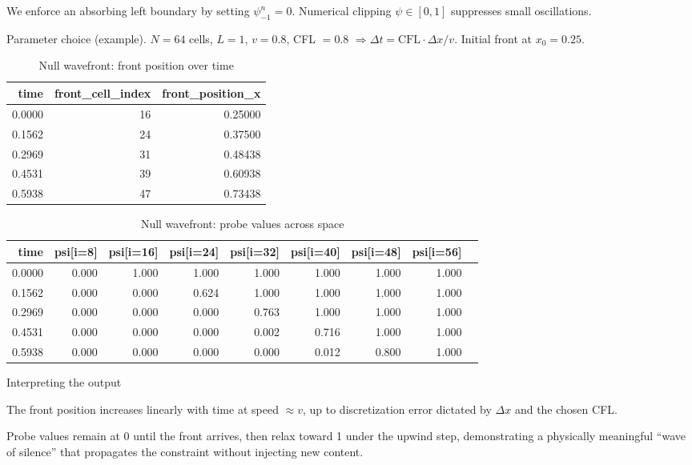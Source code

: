 \documentclass[11pt,a4paper]{article}
\begin{document}
We enforce an absorbing left boundary by setting $\psi_{-1}^n = 0$. Numerical clipping $\psi \in [0,1]$ suppresses small oscillations.

Parameter choice (example). $N=64$ cells, $L=1$, $v=0.8$, CFL $=0.8$ $\Rightarrow \Delta t = \mathrm{CFL} \cdot \Delta x / v$. Initial front at $x_0 = 0.25$.

\begin{table}[h]
\centering
\begin{tabular}{rrr}
\toprule
time & front_cell_index & front_position_x \\
\midrule
0.0000 & 16 & 0.25000 \\
0.1562 & 24 & 0.37500 \\
0.2969 & 31 & 0.48438 \\
0.4531 & 39 & 0.60938 \\
0.5938 & 47 & 0.73438 \\
\bottomrule
\end{tabular}
\caption{Null wavefront: front position over time}
\end{table}

\begin{table}[h]
\centering
\begin{tabular}{rrrrrrrrr}
\toprule
time & psi[i=8] & psi[i=16] & psi[i=24] & psi[i=32] & psi[i=40] & psi[i=48] & psi[i=56] \\
\midrule
0.0000 & 0.000 & 1.000 & 1.000 & 1.000 & 1.000 & 1.000 & 1.000 \\
0.1562 & 0.000 & 0.000 & 0.624 & 1.000 & 1.000 & 1.000 & 1.000 \\
0.2969 & 0.000 & 0.000 & 0.000 & 0.763 & 1.000 & 1.000 & 1.000 \\
0.4531 & 0.000 & 0.000 & 0.000 & 0.002 & 0.716 & 1.000 & 1.000 \\
0.5938 & 0.000 & 0.000 & 0.000 & 0.000 & 0.012 & 0.800 & 1.000 \\
\bottomrule
\end{tabular}
\caption{Null wavefront: probe values across space}
\end{table}

Interpreting the output

The front position increases linearly with time at speed $\approx v$, up to discretization error dictated by $\Delta x$ and the chosen CFL.

Probe values remain at 0 until the front arrives, then relax toward 1 under the upwind step, demonstrating a physically meaningful “wave of silence” that propagates the constraint without injecting new content.
\end{document}
